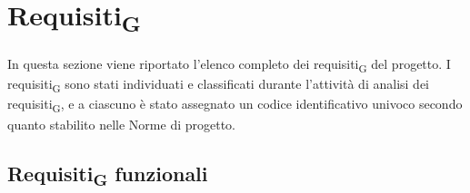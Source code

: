 \section{Requisiti\textsubscript{G}}
In questa sezione viene riportato l'elenco completo dei requisiti\textsubscript{G} del progetto.
I requisiti\textsubscript{G} sono stati individuati e classificati durante l'attività di analisi dei requisiti\textsubscript{G}, e a ciascuno è stato assegnato un codice identificativo univoco secondo quanto stabilito nelle Norme di progetto.

\subsection{Requisiti\textsubscript{G} funzionali}

\renewcommand\tabularxcolumn[1]{>{\Centering}m{#1}}
